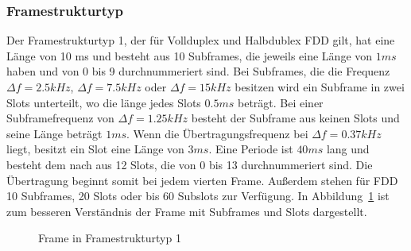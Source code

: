 \subsubsection{Framestrukturtyp}
Der Framestrukturtyp 1, der für Vollduplex und Halbdublex FDD gilt, hat eine Länge von 10 ms und besteht aus 10 Subframes, die jeweils eine Länge von $1ms$ haben und von 0 bis 9 durchnummeriert sind. Bei Subframes, die die Frequenz $\Delta f=2.5kHz$, $\Delta f=7.5kHz$ oder $\Delta f=15kHz$ besitzen wird ein Subframe in zwei Slots unterteilt, wo die länge jedes Slots $0.5ms$ beträgt. Bei einer Subframefrequenz von $\Delta f=1.25kHz$ besteht der Subframe aus keinen Slots und seine Länge beträgt $1ms$. Wenn die Übertragungsfrequenz bei $\Delta f=0.37kHz$ liegt, besitzt ein Slot eine Länge von $3ms$. Eine Periode ist $40ms$ lang und besteht dem nach aus 12 Slots, die von 0 bis 13 durchnummeriert sind. Die Übertragung beginnt somit bei jedem vierten Frame. Außerdem stehen für FDD 10 Subframes, 20 Slots oder bis 60 Subslots zur Verfügung. In Abbildung~\ref{fig:LTE_frame} ist zum besseren Verständnis der Frame mit Subframes und Slots dargestellt.



\begin{figure}
    \centering
    \caption{Frame in Framestrukturtyp 1}\label{fig:LTE_frame}
\end{figure}

